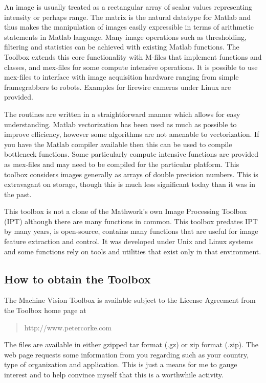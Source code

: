 \documentclass{article}
\begin{document}
{{An image is usually treated as a rectangular array of scalar values representing
intensity or perhaps range.
The matrix is the natural datatype for Matlab and thus makes the manipulation
of images easily expressible in terms of arithmetic statements in Matlab
language.
Many image operations such as thresholding, filtering and statistics can
be achieved with existing Matlab functions.
The Toolbox extends this core functionality with M-files that
implement functions and classes, and mex-files for some compute
intensive operations.
It is possible to use mex-files to interface with image acquisition
hardware ranging from simple framegrabbers to robots.
Examples for firewire cameras under Linux are provided.

The routines are written in a straightforward manner which allows
for easy understanding.  Matlab vectorization has been used as much as
possible to improve efficiency, however some algorithms are not amenable
to vectorization.
If you have the Matlab compiler available then this can be used to compile
bottleneck functions.
Some particularly compute intensive functions are provided as mex-files and
may need to be compiled for the particular platform.
This toolbox considers images generally as arrays of double precision
numbers.  This is extravagant on storage, though this is much less
significant today than it was in the past.

This toolbox is not a clone of the Mathwork's own Image Processing 
Toolbox (IPT) although there are many functions in common.
This toolbox predates IPT by many years, is open-source, contains many 
functions that are useful for image feature extraction and control.
It was developed under Unix and Linux systems and some functions
rely on tools and utilities that exist only in that environment.


\subsection{How to obtain the Toolbox}
The Machine Vision Toolbox is available subject to the License
Agreement from the Toolbox home page at
\begin{quote}
http://www.petercorke.com
\end{quote}

The files are available in either gzipped tar format (.gz) or zip
format (.zip).  The web page requests some information from you
regarding such as your country, type of organization and application.
This is just a means for me to gauge interest and to help convince 
myself that this is a worthwhile activity.

}}
\end{document}

